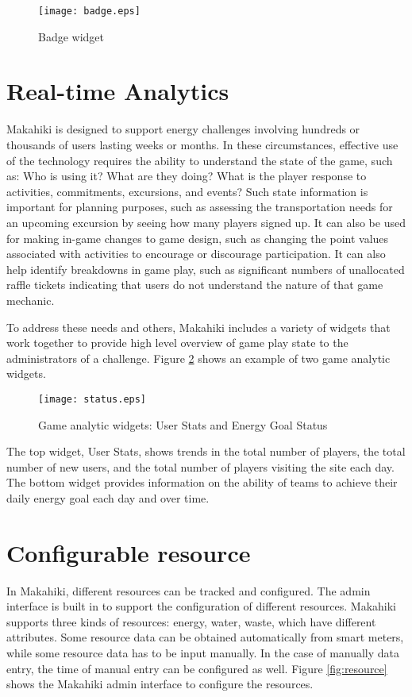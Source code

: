 \begin{figure}[t!]
  \center
  \texttt{[image: badge.eps]}
  \caption{Badge widget}
  \label{fig:badge}
\end{figure}

\section{Real-time Analytics}

Makahiki is designed to support energy challenges involving hundreds or thousands of users lasting weeks or months.  In these circumstances, effective use of the technology requires the ability to understand the state of the game, such as: Who is using it? What are they doing? What is the player response to activities, commitments, excursions, and events?   Such state information is important for planning purposes, such as assessing the transportation needs for an upcoming excursion by seeing how many players signed up.   It can also be used for making in-game changes to game design, such as changing the point values associated with activities to encourage or discourage participation.  It can also help identify breakdowns in game play, such as significant numbers of unallocated raffle tickets indicating that users do not understand the nature of that game mechanic.

To address these needs and others, Makahiki includes a variety of widgets that work together to provide high level overview of game play state to the administrators of a challenge. Figure \ref{fig:status} shows an example of two game analytic widgets.

\begin{figure}[t!]
  \center
  \texttt{[image: status.eps]}
  \caption{Game analytic widgets: User Stats and Energy Goal Status}
  \label{fig:status}
\end{figure}

The top widget, User Stats, shows trends in the total number of players, the total number of new users, and the total number of players visiting the site each day.  The bottom widget provides information on the ability of teams to achieve their daily energy goal each day and over time.

\section{Configurable resource}
In Makahiki, different resources can be tracked and configured. The admin interface is built in to support the configuration of different resources. Makahiki supports three kinds of resources: energy, water, waste, which have different attributes. Some resource data can be obtained automatically from smart meters, while some resource data has to be input manually. In the case of manually data entry, the time of manual entry can be configured as well. Figure \ref{fig:resource} shows the Makahiki admin interface to configure the resources.

